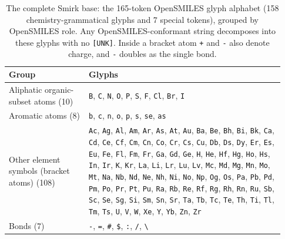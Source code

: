 \begin{table}[htbp]
  \centering
  \caption{The complete Smirk base: the 165-token OpenSMILES glyph alphabet (158 chemistry-grammatical glyphs and 7 special tokens), grouped by OpenSMILES role. Any OpenSMILES-conformant string decomposes into these glyphs with no \texttt{[UNK]}. Inside a bracket atom \texttt{+} and \texttt{-} also denote charge, and \texttt{-} doubles as the single bond.}
  \label{tab:base-glyphs}
  \small
  \begin{tabular}{@{}p{0.27\linewidth} p{0.66\linewidth}@{}}
    \toprule
    Group & Glyphs \\
    \midrule
    Aliphatic organic-subset atoms (10) & \texttt{B}, \texttt{C}, \texttt{N}, \texttt{O}, \texttt{P}, \texttt{S}, \texttt{F}, \texttt{Cl}, \texttt{Br}, \texttt{I} \\
    \addlinespace[3pt]
    Aromatic atoms (8) & \texttt{b}, \texttt{c}, \texttt{n}, \texttt{o}, \texttt{p}, \texttt{s}, \texttt{se}, \texttt{as} \\
    \addlinespace[3pt]
    Other element symbols (bracket atoms) (108) & \texttt{Ac}, \texttt{Ag}, \texttt{Al}, \texttt{Am}, \texttt{Ar}, \texttt{As}, \texttt{At}, \texttt{Au}, \texttt{Ba}, \texttt{Be}, \texttt{Bh}, \texttt{Bi}, \texttt{Bk}, \texttt{Ca}, \texttt{Cd}, \texttt{Ce}, \texttt{Cf}, \texttt{Cm}, \texttt{Cn}, \texttt{Co}, \texttt{Cr}, \texttt{Cs}, \texttt{Cu}, \texttt{Db}, \texttt{Ds}, \texttt{Dy}, \texttt{Er}, \texttt{Es}, \texttt{Eu}, \texttt{Fe}, \texttt{Fl}, \texttt{Fm}, \texttt{Fr}, \texttt{Ga}, \texttt{Gd}, \texttt{Ge}, \texttt{H}, \texttt{He}, \texttt{Hf}, \texttt{Hg}, \texttt{Ho}, \texttt{Hs}, \texttt{In}, \texttt{Ir}, \texttt{K}, \texttt{Kr}, \texttt{La}, \texttt{Li}, \texttt{Lr}, \texttt{Lu}, \texttt{Lv}, \texttt{Mc}, \texttt{Md}, \texttt{Mg}, \texttt{Mn}, \texttt{Mo}, \texttt{Mt}, \texttt{Na}, \texttt{Nb}, \texttt{Nd}, \texttt{Ne}, \texttt{Nh}, \texttt{Ni}, \texttt{No}, \texttt{Np}, \texttt{Og}, \texttt{Os}, \texttt{Pa}, \texttt{Pb}, \texttt{Pd}, \texttt{Pm}, \texttt{Po}, \texttt{Pr}, \texttt{Pt}, \texttt{Pu}, \texttt{Ra}, \texttt{Rb}, \texttt{Re}, \texttt{Rf}, \texttt{Rg}, \texttt{Rh}, \texttt{Rn}, \texttt{Ru}, \texttt{Sb}, \texttt{Sc}, \texttt{Se}, \texttt{Sg}, \texttt{Si}, \texttt{Sm}, \texttt{Sn}, \texttt{Sr}, \texttt{Ta}, \texttt{Tb}, \texttt{Tc}, \texttt{Te}, \texttt{Th}, \texttt{Ti}, \texttt{Tl}, \texttt{Tm}, \texttt{Ts}, \texttt{U}, \texttt{V}, \texttt{W}, \texttt{Xe}, \texttt{Y}, \texttt{Yb}, \texttt{Zn}, \texttt{Zr} \\
    \addlinespace[3pt]
    Bonds (7) & \texttt{-}, \texttt{=}, \texttt{\#}, \texttt{\$}, \texttt{:}, \texttt{/}, \texttt{\textbackslash{}} \\

\end{tabular}
\end{table}
